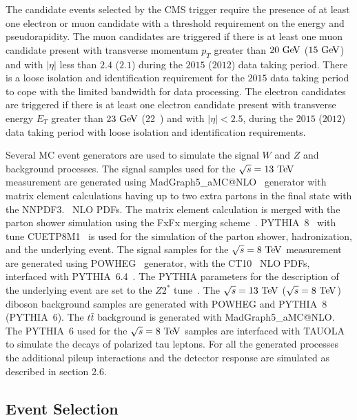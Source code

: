 The candidate events selected by the CMS trigger require the presence of at least one electron or muon candidate with a threshold requirement on the energy and pseudorapidity. The muon candidates are triggered if there is at least one muon candidate present with transverse momentum $p_{T}$ greater than $20~\mathrm{Ge\kern -0.1em V}$ ($15~\mathrm{Ge\kern -0.1em V}$) and with $|\eta|$ less than $2.4$ ($2.1$) during the $2015$ ($2012$) data taking period. There is a loose isolation and identification requirement for the $2015$ data taking period to cope with the limited bandwidth for data processing. The electron candidates are triggered if there is at least one electron candidate present with transverse energy $E_{T}$ greater than $23~\mathrm{Ge\kern -0.1em V}$ (22~\GeV) and with $|\eta|<2.5$, during the $2015$ ($2012$) data taking period with loose isolation and identification requirements.

Several MC event generators are used to simulate the signal $W$ and $Z$ and background processes. The signal samples used for the $\sqrt{s}=13~\mathrm{Te\kern -0.1em V}$ measurement are generated using MadGraph5\_aMC@NLO~\cite{Alwall:2007st} generator with matrix element calculations having up to two extra partons in the final state with the NNPDF3.~\cite{Ball:2014uwa} NLO PDFs. The matrix element calculation is merged with the parton shower simulation using the FxFx merging scheme~\cite{Frederix:2012ps}. PYTHIA~8~\cite{Sjostrand:2006za,Sjostrand:2014zea}  with tune CUETP8M1~\cite{Skands:2014pea} is used for the simulation of the parton shower, hadronization, and the underlying event.  The signal samples for the $\sqrt{s}=8~\mathrm{Te\kern -0.1em V}$ measurement are generated using POWHEG~\cite{POWHEG-V, POWHEG1, POWHEG2, POWHEG3} generator, with the CT10~\cite{Lai:2010vv} NLO PDFs, interfaced with PYTHIA~6.4~\cite{Sjostrand:2006za}. The PYTHIA parameters for the description of the underlying event are set to the $Z2^{*}$ tune~\cite{CMS-PAS-FSQ-12-020}. The  $\sqrt{s}=13~\mathrm{Te\kern -0.1em V}$ ($\sqrt{s}=8~\mathrm{Te\kern -0.1em V}$) diboson background samples are generated with POWHEG and PYTHIA~8 (PYTHIA~6). The $t\bar{t}$ background is generated with MadGraph5\_aMC@NLO. The PYTHIA~6 used for the  $\sqrt{s}=8~\mathrm{Te\kern -0.1em V}$ samples are interfaced with TAUOLA to simulate the decays of polarized tau leptons. For all the generated processes the additional pileup interactions and the detector response are simulated as described in section 2.6.

\subsection{Event Selection}

